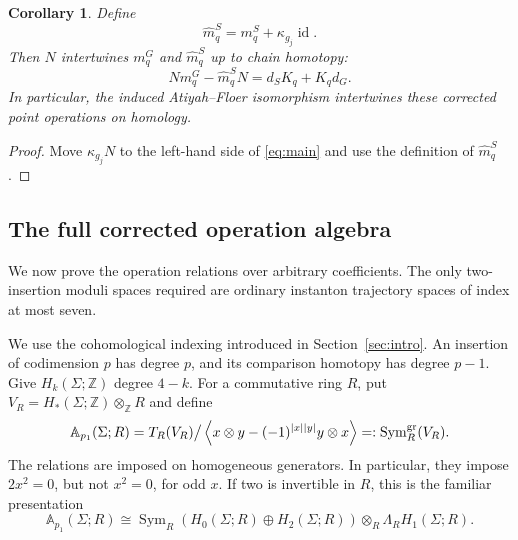 \documentclass[11pt]{amsart}
\newtheorem{corollary}[theorem]{Corollary}
\theoremstyle{definition}
\theoremstyle{remark}
\theoremstyle{plain}
\newcommand{\ZZ}{\mathbb{Z}}
\newcommand{\id}{\operatorname{id}}
\begin{document}
\begin{corollary}\label{cor:corrected-operator}
Define
\[
                  \widehat m_q^S=m_q^S+\kappa_{g_j}\id.
\]
Then $N$ intertwines $m_q^G$ and $\widehat m_q^S$ up to chain homotopy:
\begin{equation}\label{eq:corrected-intertwining}
             Nm_q^G-\widehat m_q^S N=d_SK_q+K_qd_G.
\end{equation}
In particular, the induced Atiyah--Floer isomorphism intertwines these
corrected point operations on homology.
\end{corollary}

\begin{proof}
Move $\kappa_{g_j}N$ to the left-hand side of
\eqref{eq:main} and use the definition of $\widehat m_q^S$.
\end{proof}

\subsection{The full corrected operation algebra}
\label{subsec:full-operation-algebra}

We now prove the operation relations over arbitrary coefficients.
The only two-insertion moduli spaces required are ordinary
instanton trajectory spaces of index at most seven.

We use the cohomological indexing introduced in
Section~\ref{sec:intro}. An insertion of codimension $p$
has degree $p$, and its comparison homotopy has degree $p-1$.
Give $H_k(\Sigma;\ZZ)$ degree $4-k$. For a commutative ring $R$, put
$V_R=H_*(\Sigma;\ZZ)\otimes_{\ZZ}R$ and define
\begin{equation}\label{eq:integral-observable-algebra}
 \mathbb A_{p_1}(\Sigma;R)
 =T_R(V_R)\big/
   \left\langle x\otimes y-(-1)^{|x||y|}y\otimes x\right\rangle
 =:\operatorname{Sym}^{\rm gr}_R(V_R).
\end{equation}
The relations are imposed on homogeneous generators. In particular,
they impose $2x^2=0$, but not $x^2=0$, for odd $x$.
If two is invertible in $R$, this is the familiar presentation
\begin{equation}\label{eq:usual-observable-algebra}
 \mathbb A_{p_1}(\Sigma;R)
 \cong
 \operatorname{Sym}_R(H_0(\Sigma;R)\oplus H_2(\Sigma;R))
 \otimes_R\Lambda_R H_1(\Sigma;R).
\end{equation}
\end{document}
